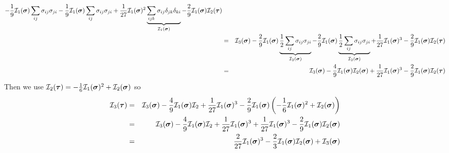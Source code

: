 \begin{eqnarray}
-\frac19 {\cal I}_1(\bm\sigma)  \sum_{ij} \sigma_{ij}\sigma_{ji} 
-\frac19 {\cal I}_1(\bm\sigma)  \sum_{ij} \sigma_{ij}\sigma_{ji} 
+\frac{1}{27} {\cal I}_1(\bm\sigma) ^2
\underbrace{\sum_{ijk}  \sigma_{ij}   \delta_{jk} \delta_{ki} }_{{\cal I}_1(\bm\sigma) }
-\frac29  {\cal I}_1(\bm\sigma)      {\cal I}_2(\bm\tau)
\nonumber\\
&=& 
{\cal I}_3(\bm\sigma)
-\frac29 {\cal I}_1(\bm\sigma)  \underbrace{\frac12 \sum_{ij} \sigma_{ij}\sigma_{ji} }_{{\cal I}_2(\bm\sigma)}
-\frac29 {\cal I}_1(\bm\sigma)  \underbrace{\frac12 \sum_{ij} \sigma_{ij}\sigma_{ji} }_{{\cal I}_2(\bm\sigma)}
+\frac{1}{27} {\cal I}_1(\bm\sigma)^3
-\frac29  {\cal I}_1(\bm\sigma)   {\cal I}_2(\bm\tau) 
\nonumber\\
&=& 
{\cal I}_3(\bm\sigma)
-\frac49 {\cal I}_1(\bm\sigma)  {\cal I}_2(\bm\sigma) 
+\frac{1}{27} {\cal I}_1(\bm\sigma) ^3
-\frac29  {\cal I}_1(\bm\sigma)     {\cal I}_2(\bm\tau) \nonumber
\end{eqnarray}
Then we use ${\cal I}_2(\bm\tau) = -\frac16 {\cal I}_1(\bm\sigma)^2 + {\cal I}_2(\bm\sigma)$ so 
\begin{eqnarray}
{\cal I}_3(\bm\tau) 
&=& 
{\cal I}_3(\bm\sigma)  -\frac49 {\cal I}_1(\bm\sigma)  {\cal I}_2   
+\frac{1}{27} {\cal I}_1(\bm\sigma) ^3   -\frac29  {\cal I}_1(\bm\sigma)   
\left(-\frac16 {\cal I}_1(\bm\sigma) ^2 + {\cal I}_2(\bm\sigma)   \right) \nonumber\\
&=& 
{\cal I}_3(\bm\sigma)  -\frac49 {\cal I}_1(\bm\sigma)  {\cal I}_2   +\frac{1}{27} {\cal I}_1(\bm\sigma)^3   
+\frac{1}{27}  {\cal I}_1(\bm\sigma) ^3  -\frac29  {\cal I}_1(\bm\sigma)   {\cal I}_2(\bm\sigma) \nonumber\\
&=& \frac{2}{27} {\cal I}_1(\bm\sigma)^3 
-\frac23 {\cal I}_1(\bm\sigma){\cal I}_2(\bm\sigma) + {\cal I}_3(\bm \sigma) \nonumber
\end{eqnarray}







\newpage


